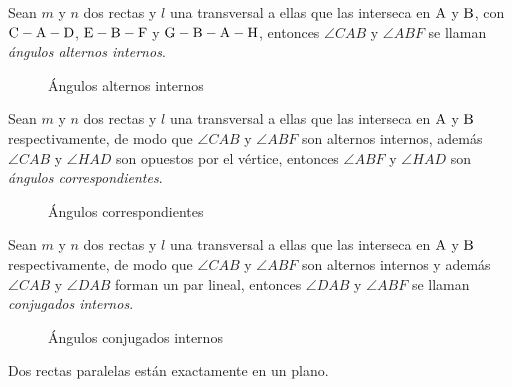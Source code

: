 \begin{definition}
    Sean $m$ y $n$ dos rectas y $l$ una transversal a ellas que las interseca en $\rm A$ y $\rm B$, con $\rm C-A-D$, $\rm E-B-F$ y $\rm G-B-A-H$, entonces $\angle{CAB}$ y $\angle{ABF}$ se llaman \textit{ángulos alternos internos}.

    \begin{figure}[!h]
        \centering
        
        \caption{Ángulos alternos internos}
        \label{fig:alternos-internos}
    \end{figure}
    
\end{definition}

\clearpage

\begin{definition}
    Sean $m$ y $n$ dos rectas y $l$ una transversal a ellas que las interseca en $\rm A$ y $\rm B$ respectivamente, de modo que $\angle{CAB}$ y $\angle{ABF}$ son alternos internos, además $\angle{CAB}$ y $\angle{HAD}$ son opuestos por el vértice, entonces $\angle{ABF}$ y $\angle{HAD}$ son \textit{ángulos correspondientes}.

    \begin{figure}[!h]
        \centering
        
        \caption{Ángulos correspondientes}
        \label{fig:correspondientes}
    \end{figure}
    
\end{definition}

\begin{definition}
    Sean $m$ y $n$ dos rectas y $l$ una transversal a ellas que las interseca en $\rm A$ y $\rm B$ respectivamente, de modo que $\angle{CAB}$ y $\angle{ABF}$ son alternos internos y además $\angle{CAB}$ y $\angle{DAB}$ forman un par lineal, entonces $\angle{DAB}$ y $\angle{ABF}$ se llaman \textit{conjugados internos}.

    \begin{figure}[!h]
        \centering
        
        \caption{Ángulos conjugados internos}
        \label{fig:conjugados}
    \end{figure}
    
\end{definition}

\begin{theorem}
    Dos rectas paralelas están exactamente en un plano.
\end{theorem}

